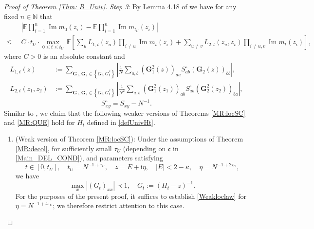 \documentclass[10pt,reqno]{article}
\theoremstyle{plain} %
\theoremstyle{remark}
\numberwithin{equation}{section}
\begin{document}
\begin{proof}[Proof of Theorem \ref{Thm: B_Univ}]


\medskip 
\noindent 
\emph{Step 3}: %
By Lemma 4.18 of \cite{Xu:2024aa} we have for any fixed $n \in \mathbb{N}$ that
\begin{align}\label{EMCTE}
\; &\;   \left|\mathbb{E} \prod_{i=1}^n \operatorname{Im} m_0\left(z_i\right)-\mathbb{E} \prod_{i=1}^n \operatorname{Im} m_{t_U}\left(z_i\right)\right|
\\\nonumber
 \leq \; &\; C\cdot t_U\cdot \max_{0\le t\le t_U}\,\mathbb{E}\left[\sum_u L_{1, t}\left(z_u\right) \prod_{i \neq u} \operatorname{Im} m_t\left(z_i\right)+\sum_{u \neq v} L_{2, t}\left(z_u, z_v\right) \prod_{i \neq u, v} \operatorname{Im} m_t\left(z_i\right)\right],
\end{align}
where  $C>0$ is an absolute constant and 
$$
\begin{aligned}
L_{1, t}(z) & :=\sum_{\mathbf{G}_1, \mathbf{G}_2 \in\left\{G_t, G_t^*\right\}}\left|\frac{1}{N} \sum_{a, b}\left(\mathbf{G}_1^2(z)\right)_{a a} S_{a b}^{\circ}\left(\mathbf{G}_2(z)\right)_{b b}\right|, \\
L_{2, t}\left(z_1, z_2\right) & :=\sum_{\mathbf{G}_1, \mathbf{G}_2 \in\left\{G_t, G_t^*\right\}}\left|\frac{1}{N^2} \sum_{a, b}\left(\mathbf{G}_1^2\left(z_1\right)\right)_{a b} S_{a b}^{\circ}\left(\mathbf{G}_2^2\left(z_2\right)\right)_{b a}\right| , 
\end{aligned}
$$
$$
S_{xy}^{\circ}=S_{xy}-N^{-1}.
$$
Similar to \cite{Xu:2024aa}, we claim that the following weaker versions of Theorems \ref{MR:locSC} and \ref{MR:QUE} hold for $H_t$ defined in \eqref{defUnivHt}.

\begin{enumerate}
    \item (Weak version of Theorem \ref{MR:locSC}): Under the assumptions of Theorem \ref{MR:decol}, for sufficiently small $\tau_U$ (depending on $\mathfrak{c}$ in \eqref{Main_DEL_COND}), and parameters satisfying
    \[
    t \in [0,t_U], \quad t_U = N^{-1+\tau_U}, \quad z = E + \mathrm{i}\eta, \quad |E| < 2 - \kappa, \quad \eta = N^{-1+2\tau_U},
    \]
    we have
    \begin{equation}\label{Weakloclaw}
        \max_{x} |(G_t)_{xx}| \prec 1, \quad G_t := (H_t - z)^{-1}.
    \end{equation}
    For the purposes of the present proof, it suffices to establish \eqref{Weakloclaw} for \(\eta=N^{-1+4\tau_U}\); we therefore restrict attention to this case.


\end{enumerate}
\end{proof}
\end{document}
